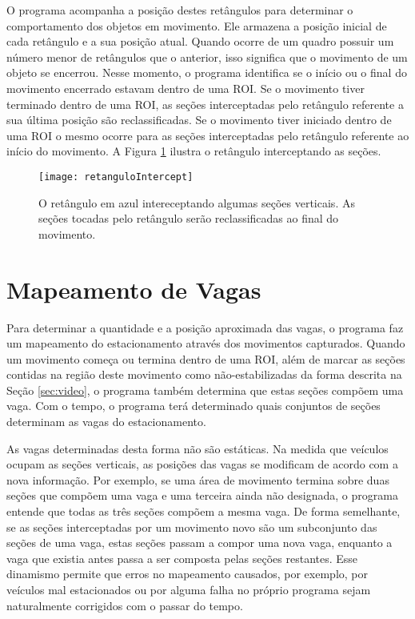 O programa acompanha a posição destes retângulos para determinar o comportamento dos objetos em movimento. Ele armazena a posição inicial de cada retângulo e a sua posição atual. Quando ocorre de um quadro possuir um número menor de retângulos que o anterior, isso significa que o movimento de um objeto se encerrou. Nesse momento, o programa identifica se o início ou o final do movimento encerrado estavam dentro de uma ROI. Se o movimento tiver terminado dentro de uma ROI, as seções interceptadas pelo retângulo referente a sua última posição são reclassificadas. Se o movimento tiver iniciado dentro de uma ROI o mesmo ocorre para as seções interceptadas pelo retângulo referente ao início do movimento. A Figura \ref{fig:movimentoIntercept} ilustra o retângulo interceptando as seções.

\begin{figure}
\centering
\texttt{[image: retanguloIntercept]}
\centering
\caption{O retângulo em azul intereceptando algumas seções verticais. As seções tocadas pelo retângulo serão reclassificadas ao final do movimento.}
\label{fig:movimentoIntercept}
\end{figure}


\section{Mapeamento de Vagas}

Para determinar a quantidade e a posição aproximada das vagas, o programa faz um mapeamento do estacionamento através dos movimentos capturados. Quando um movimento começa ou termina dentro de uma ROI, além de marcar as seções contidas na região deste movimento como não-estabilizadas da forma descrita na Seção \ref{sec:video}, o programa também determina que estas seções compõem uma vaga. Com o tempo, o programa terá determinado quais conjuntos de seções determinam as vagas do estacionamento.

As vagas determinadas desta forma não são estáticas. Na medida que veículos ocupam as seções verticais, as posições das vagas se modificam de acordo com a nova informação. Por exemplo, se uma área de movimento termina sobre duas seções que compõem uma vaga e uma terceira ainda não designada, o programa entende que todas as três seções compõem a mesma vaga. De forma semelhante, se as seções interceptadas por um movimento novo são um subconjunto das seções de uma vaga, estas seções passam a compor uma nova vaga, enquanto a vaga que existia antes passa a ser composta pelas seções restantes. Esse dinamismo permite que erros no mapeamento causados, por exemplo, por veículos mal estacionados ou por alguma falha no próprio programa sejam naturalmente corrigidos com o passar do tempo.

